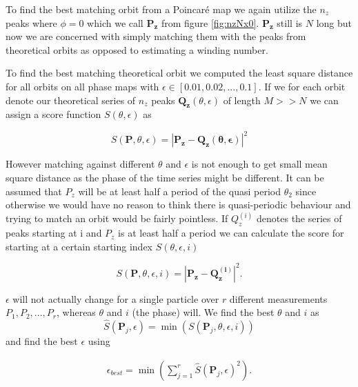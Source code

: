\label{sec:matchorbit}
To find the best matching orbit from a Poincaré map we again utilize the $n_z$ peaks where $\phi = 0$ which we call $\mathbf{P_z}$ from figure \ref{fig:nzNx0}. $\mathbf{P_z}$ still is $N$ long but now we are concerned with simply matching them with the peaks from theoretical orbits as opposed to estimating a winding number.


To find the best matching theoretical orbit we computed the least square distance for all orbits on all phase maps with $\epsilon \in [0.01, 0.02, ..., 0.1]$. If we for each orbit denote our theoretical series of $n_z$ peaks $\mathbf{Q_z}(\theta, \epsilon)$ of length $M >> N$ we can assign a score function $S(\theta, \epsilon)$ as

\begin{equation}
S(\mathbf{P}, \theta, \epsilon) = \left| \mathbf{P_z} - \mathbf{Q_z(\theta, \epsilon)} \right|^2
\end{equation}

However matching against different $\theta$ and $\epsilon$ is not enough to get small mean square distance as the phase 
of the time series might be different. It can be assumed that $P_z$ will be at least half a period of the quasi period 
$\theta_2$ since otherwise we would have no reason to think there is quasi-periodic behaviour and trying to match an 
orbit would be fairly pointless. If $Q_z^{(i)}$ denotes the series of peaks starting at i and  $P_z$ is at 
least half a period we can calculate the score for starting at a certain starting index $S(\theta, \epsilon, i)$

\begin{equation}
S(\mathbf{P}, \theta, \epsilon, i) = \left| \mathbf{P_z} - \mathbf{Q_z^{(i)}} \right|^2.
\end{equation}

$\epsilon$ will not actually change for a single particle over $r$ different measurements $P_1, P_2, ..., P_r$, whereas $\theta$ and $i$ (the phase) will. We find the best $\theta$ and $i$ as
\begin{equation}
\hat{S}(\mathbf{P}_j, \epsilon) =  \min(S(\mathbf{P}_j, \theta, \epsilon, i))
\end{equation}
and find the best $\epsilon$ using

\begin{eqnarray}
\epsilon_{best} = \min(\sum\limits_{j=1}^{r} \hat{S}(\mathbf{P}_j, \epsilon)^2).
\end{eqnarray}

